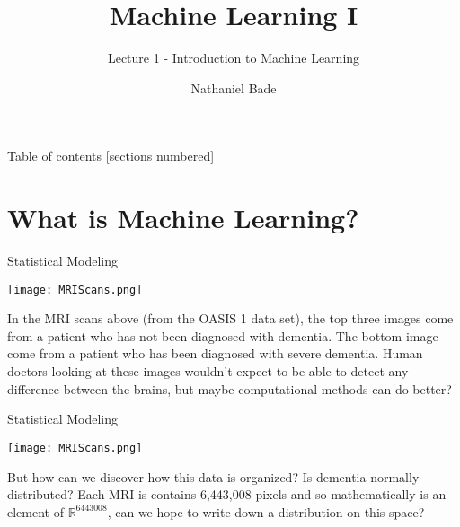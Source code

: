 \documentclass[10pt, handout]{beamer}
\title{Machine Learning I}
\subtitle{Lecture 1 - Introduction to Machine Learning}
\date{}
\author{Nathaniel Bade}
\institute{Northeastern University Department of Mathematics}
\begin{document}
\maketitle

\begin{frame}{Table of contents}
  [sections numbered]
  \tableofcontents[hideallsubsections]
\end{frame}



\section{What is Machine Learning?} %



\begin{frame}[t]{Statistical Modeling}
  \begin{minipage}[t][0.5\textheight][t]{\textwidth}
    \centering
     \texttt{[image: MRIScans.png]}
  \end{minipage}
  \vfill
  \begin{minipage}[t][0.5\textheight][t]{\textwidth}
In the MRI scans above (from the OASIS 1 data set), the top three images come from a patient who has not been diagnosed with dementia. The bottom image come from a patient who has been diagnosed with severe dementia. Human doctors looking at these images wouldn't expect to be able to detect any difference between the brains, but maybe computational methods can do better?
  \end{minipage}
\end{frame}



\begin{frame}[t]{Statistical Modeling}
  \begin{minipage}[t][0.5\textheight][t]{\textwidth}
    \centering
     \texttt{[image: MRIScans.png]}
  \end{minipage}
  \vfill
  \begin{minipage}[t][0.5\textheight][t]{\textwidth}
But how can we discover how this data is organized? Is dementia normally distributed? \pause Each MRI is contains 6,443,008 pixels and so mathematically is an element of $\mathbb{R}^{6443008}$, can we hope to write down a distribution on this space?
  \end{minipage}
\end{frame}
\end{document}
